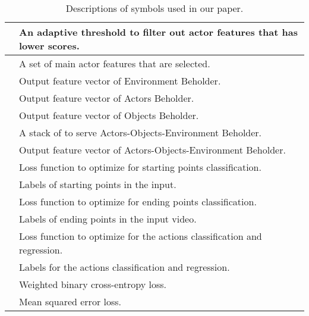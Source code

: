 \documentclass[sn-mathphys]{sn-jnl}
\theoremstyle{thmstyleone}\newtheorem{theorem}{Theorem}\newtheorem{proposition}[theorem]{Proposition}
\theoremstyle{thmstyletwo}\newtheorem{example}{Example}\newtheorem{remark}{Remark}
\theoremstyle{thmstylethree}\newtheorem{definition}{Definition}
\begin{document}
\begin{table}[!ht]
\begin{tabular}{c|l}
         & An adaptive threshold to filter out actor features that has lower scores.\\ \hline
         & A set of main actor features that are selected.\\ \hline
         & Output feature vector of Environment Beholder.\\ \hline
         & Output feature vector of Actors Beholder.\\ \hline
         & Output feature vector of Objects Beholder.\\ \hline
         & A stack of  to serve Actors-Objects-Environment Beholder.\\ \hline
         & Output feature vector of Actors-Objects-Environment Beholder.\\ \hline
         & Loss function to optimize for starting points classification.\\ \hline
         & Labels of starting points in the input.\\ \hline
         & Loss function to optimize for ending points classification.\\ \hline
         & Labels of ending points in the input video.\\ \hline
         & Loss function to optimize for the actions classification and regression.\\ \hline
         & Labels for the actions classification and regression.\\ \hline
         & Weighted binary cross-entropy loss.\\ \hline
         & Mean squared error loss.\\ \hline
    \end{tabular}
\caption{Descriptions of symbols used in our paper.}
    \label{tab:notations}
\end{table}
\end{document}
